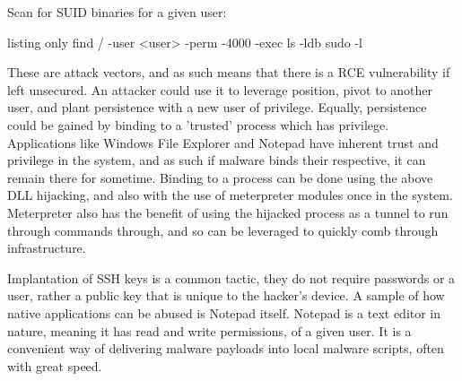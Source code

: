 Scan for SUID binaries for a given user:
\begin{tcblisting}{listing only}
find / -user <user> -perm -4000 -exec ls -ldb {} \;
sudo -l
\end{tcblisting}

These are attack vectors, and as such means that there is a RCE vulnerability if left unsecured. An attacker could use it to leverage position, pivot to another user, and plant persistence with a new user of privilege. Equally, persistence could be gained by binding to
a 'trusted' process which has privilege. Applications like Windows File Explorer and Notepad have inherent trust and privilege in the system, and as such if malware binds their respective, it can remain there for sometime. Binding to a process can be done using the above DLL hijacking,
and also with the use of meterpreter modules once in the system. Meterpreter also has the benefit of using the hijacked process as a tunnel to run through commands through, and so can be leveraged to quickly comb through infrastructure. 

Implantation of SSH keys is a common tactic, they do not require passwords or a user, rather a public key that is unique to the hacker's device. A sample of how native applications can be abused is Notepad itself. Notepad is a text editor in nature, meaning it has read and write permissions, of a given user. It is a convenient way of delivering malware payloads into local malware scripts, often with great speed.







